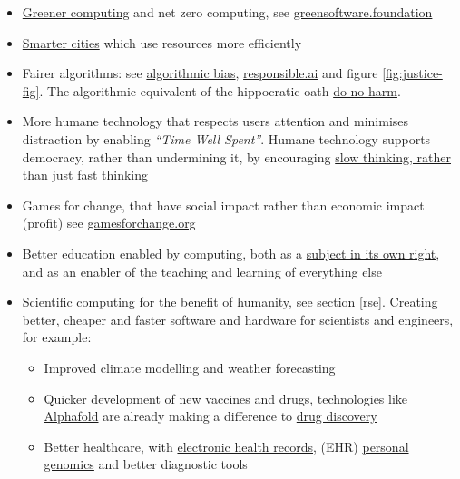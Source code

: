 \documentclass[
]{book}
\providecommand{\tightlist}{%
  \setlength{\itemsep}{0pt}\setlength{\parskip}{0pt}}
\begin{document}
\begin{itemize}
\tightlist
\item
  \href{https://en.wikipedia.org/wiki/Green_computing}{Greener computing} and net zero computing, see \href{https://greensoftware.foundation/}{greensoftware.foundation} \citep{Knowles2022, netzero}
\item
  \href{https://en.wikipedia.org/wiki/Smart_city}{Smarter cities} which use resources more efficiently \citep{smartercities}
\item
  Fairer algorithms: see \href{https://en.wikipedia.org/wiki/Algorithmic_bias}{algorithmic bias}, \href{https://www.responsible.ai/}{responsible.ai} and figure \ref{fig:justice-fig}. The algorithmic equivalent of the hippocratic oath \href{https://en.wikipedia.org/wiki/Primum_non_nocere}{do no harm}.
\item
  More humane technology that respects users attention and minimises distraction by enabling \emph{``Time Well Spent''}. Humane technology supports democracy, rather than undermining it, by encouraging \href{https://en.wikipedia.org/wiki/Thinking,_Fast_and_Slow}{slow thinking, rather than just fast thinking} \citep{Kahneman}
\item
  Games for change, that have social impact rather than economic impact (profit) see \href{https://www.gamesforchange.org/}{gamesforchange.org}
\item
  Better education enabled by computing, both as a \href{https://en.wikipedia.org/wiki/Computer_science_education}{subject in its own right}, and as an enabler of the teaching and learning of everything else
\item
  Scientific computing for the benefit of humanity, see section \ref{rse}. Creating better, cheaper and faster software and hardware for scientists and engineers, for example:

  \begin{itemize}
  \tightlist
  \item
    Improved climate modelling and weather forecasting
  \item
    Quicker development of new vaccines and drugs, technologies like \href{https://en.wikipedia.org/wiki/AlphaFold}{Alphafold} are already making a difference to \href{https://en.wikipedia.org/wiki/Drug_discovery}{drug discovery} \citep{Jumper2021}
  \item
    Better healthcare, with \href{https://en.wikipedia.org/wiki/Electronic_health_record}{electronic health records}, (EHR) \href{https://en.wikipedia.org/wiki/Personal_genomics}{personal genomics} and better diagnostic tools \citep{alphafoldeditorial}
  \end{itemize}
\end{itemize}
\end{document}
